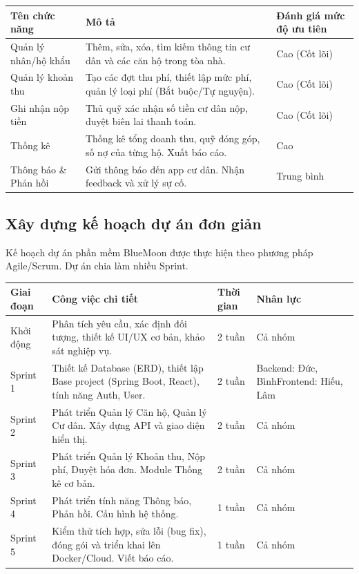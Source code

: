 \documentclass[12pt,a4paper]{article}
\begin{document}
\begin{table}[H]
    \centering
    \begin{tabularx}{\textwidth}{|L{4cm}|X|C{4cm}|}
    \hline
    \textbf{Tên chức năng} & \textbf{Mô tả} & \textbf{Đánh giá mức độ ưu tiên} \\
    \hline
    Quản lý nhân/hộ khẩu & Thêm, sửa, xóa, tìm kiếm thông tin cư dân và các căn hộ trong tòa nhà. & Cao (Cốt lõi) \\
    \hline
    Quản lý khoản thu & Tạo các đợt thu phí, thiết lập mức phí, quản lý loại phí (Bắt buộc/Tự nguyện). & Cao (Cốt lõi) \\
    \hline
    Ghi nhận nộp tiền & Thủ quỹ xác nhận số tiền cư dân nộp, duyệt biên lai thanh toán. & Cao (Cốt lõi) \\
    \hline
    Thống kê & Thống kê tổng doanh thu, quỹ đóng góp, số nợ của từng hộ. Xuất báo cáo. & Cao \\
    \hline
    Thông báo \& Phản hồi & Gửi thông báo đến app cư dân. Nhận feedback và xử lý sự cố. & Trung bình \\
    \hline
    \end{tabularx}
\end{table}

\subsection{Xây dựng kế hoạch dự án đơn giản}
Kế hoạch dự án phần mềm BlueMoon được thực hiện theo phương pháp Agile/Scrum. Dự án chia làm nhiều Sprint.

\begin{table}[H]
    \centering
    \begin{tabularx}{\textwidth}{|L{3cm}|X|C{3cm}|C{3cm}|}
    \hline
    \textbf{Giai đoạn} & \textbf{Công việc chi tiết} & \textbf{Thời gian} & \textbf{Nhân lực} \\
    \hline
    Khởi động & Phân tích yêu cầu, xác định đối tượng, thiết kế UI/UX cơ bản, khảo sát nghiệp vụ. & 2 tuần & Cả nhóm \\
    \hline
    Sprint 1 & Thiết kế Database (ERD), thiết lập Base project (Spring Boot, React), tính năng Auth, User. & 2 tuần & Backend: Đức, Bình\newline Frontend: Hiếu, Lâm \\
    \hline
    Sprint 2 & Phát triển Quản lý Căn hộ, Quản lý Cư dân. Xây dựng API và giao diện hiển thị. & 2 tuần & Cả nhóm \\
    \hline
    Sprint 3 & Phát triển Quản lý Khoản thu, Nộp phí, Duyệt hóa đơn. Module Thống kê cơ bản. & 2 tuần & Cả nhóm \\
    \hline
    Sprint 4 & Phát triển tính năng Thông báo, Phản hồi. Cấu hình hệ thống. & 1 tuần & Cả nhóm \\
    \hline
    Sprint 5 & Kiểm thử tích hợp, sửa lỗi (bug fix), đóng gói và triển khai lên Docker/Cloud. Viết báo cáo. & 1 tuần & Cả nhóm \\
    \hline
    \end{tabularx}
\end{table}
\end{document}
